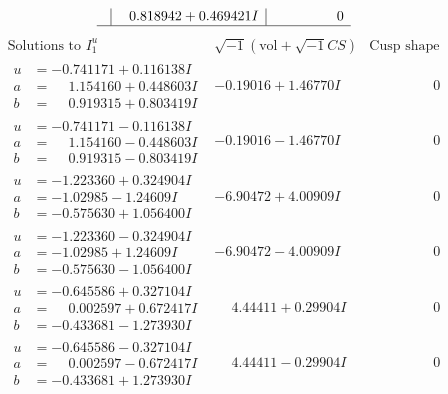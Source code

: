 \documentclass[1p]{elsarticle_modified}
\theoremstyle{definition}
\newcommand{\I}{\sqrt{-1}}
\begin{document}
$$\begin{array}{c|c|c}
 & \phantom{-}0.818942 + 0.469421 I & \phantom{-0.000000 } 0\\
 \hline 
 \end{array}$$\newpage$$\begin{array}{c|c|c}  
\text{Solutions to }I^u_{1}& \I (\text{vol} + \sqrt{-1}CS) & \text{Cusp shape}\\
 \hline 
\begin{aligned}
u &= -0.741171 + 0.116138 I \\
a &= \phantom{-}1.154160 + 0.448603 I \\
b &= \phantom{-}0.919315 + 0.803419 I\end{aligned}
 & -0.19016 + 1.46770 I & \phantom{-0.000000 } 0 \\ \hline\begin{aligned}
u &= -0.741171 - 0.116138 I \\
a &= \phantom{-}1.154160 - 0.448603 I \\
b &= \phantom{-}0.919315 - 0.803419 I\end{aligned}
 & -0.19016 - 1.46770 I & \phantom{-0.000000 } 0 \\ \hline\begin{aligned}
u &= -1.223360 + 0.324904 I \\
a &= -1.02985 - 1.24609 I \\
b &= -0.575630 + 1.056400 I\end{aligned}
 & -6.90472 + 4.00909 I & \phantom{-0.000000 } 0 \\ \hline\begin{aligned}
u &= -1.223360 - 0.324904 I \\
a &= -1.02985 + 1.24609 I \\
b &= -0.575630 - 1.056400 I\end{aligned}
 & -6.90472 - 4.00909 I & \phantom{-0.000000 } 0 \\ \hline\begin{aligned}
u &= -0.645586 + 0.327104 I \\
a &= \phantom{-}0.002597 + 0.672417 I \\
b &= -0.433681 - 1.273930 I\end{aligned}
 & \phantom{-}4.44411 + 0.29904 I & \phantom{-0.000000 } 0 \\ \hline\begin{aligned}
u &= -0.645586 - 0.327104 I \\
a &= \phantom{-}0.002597 - 0.672417 I \\
b &= -0.433681 + 1.273930 I\end{aligned}
 & \phantom{-}4.44411 - 0.29904 I & \phantom{-0.000000 } 0 \\ \hline\begin{aligned}

\end{aligned}
\end{array}$$
\end{document}
